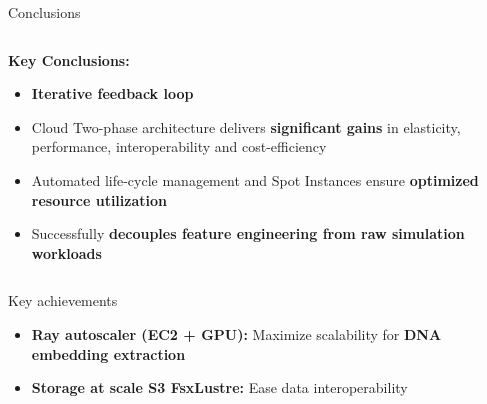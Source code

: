 \documentclass[aspectratio=169]{beamer}
\begin{document}
\begin{frame}{Conclusions}
    \begin{columns}
        \begin{column}{0.7\textwidth}
            \textbf{Key Conclusions:}
            \begin{itemize}
                \item \textbf{Iterative feedback loop} 
                \item Cloud Two-phase architecture delivers \textbf{significant gains} in elasticity, performance, interoperability and cost-efficiency
                \item Automated life-cycle management and Spot Instances ensure {\textbf{optimized resource utilization}}
                \item Successfully \textbf{decouples feature engineering from raw simulation workloads}
                
            \end{itemize}
        \end{column}
        \begin{column}{0.3\textwidth}
        \end{column}
    \end{columns}
    
    \vspace{0.3cm}
    \begin{block}{Key achievements}
        \begin{itemize}
            \item \textbf{Ray autoscaler (EC2 + GPU):} Maximize scalability for \textbf{DNA embedding extraction}
            \item \textbf{Storage at scale S3 FsxLustre:} Ease data interoperability
        \end{itemize}
    \end{block}
\end{frame}
\end{document}
